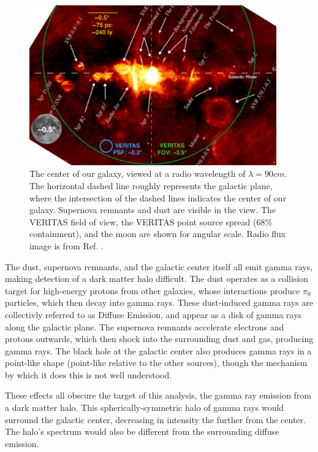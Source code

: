 \begin{figure}[ht]
  \begin{center}
    \includegraphics[width=0.95\textwidth]{images/GalacticCenterInRadio.eps}
    \caption[Galactic Center in Radio]{The center of our galaxy, viewed at a radio wavelength of $\lambda=90cm$.  The horizontal dashed line roughly represents the galactic plane, where the intersection of the dashed lines indicates the center of our galaxy.  Supernova remnants and dust are visible in the view.  The VERITAS field of view, the VERITAS point source spread (68\% containment), and the moon are shown for angular scale.  Radio flux image is from Ref. \cite{galactic_center_in_radio}.}
  \end{center}
\end{figure}

The dust, supernova remnants, and the galactic center itself all emit gamma rays, making detection of a dark matter halo difficult.
The dust operates as a collision target for high-energy protons from other galaxies, whose interactions produce $\pi_0$ particles, which then decay into gamma rays.
These dust-induced gamma rays are collectivly referred to as Diffuse Emission, and appear as a disk of gamma rays along the galactic plane.
The supernova remnants accelerate electrons and protons outwards, which then shock into the surrounding dust and gas, producing gamma rays.
The black hole at the galactic center also produces gamma rays in a point-like shape (point-like relative to the other sources), though the mechanism by which it does this is not well understood\cite{gal_cent_still_undetermined}.

These effects all obscure the target of this analysis, the gamma ray emission from a dark matter halo.
This spherically-symmetric halo of gamma rays would surround the galactic center, decreasing in intensity the further from the center.
The halo's spectrum would also be different from the surrounding diffuse emission.

